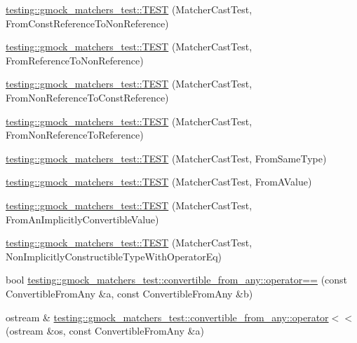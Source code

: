 \begin{DoxyCompactItemize}
\item 
\mbox{\hyperlink{namespacetesting_1_1gmock__matchers__test_a9d25aac0defd9296bf207cacd342aff0}{testing\+::gmock\+\_\+matchers\+\_\+test\+::\+T\+E\+ST}} (Matcher\+Cast\+Test, From\+Const\+Reference\+To\+Non\+Reference)
\item 
\mbox{\hyperlink{namespacetesting_1_1gmock__matchers__test_a4bb3955a1e0b603c0156c98a2dc49eea}{testing\+::gmock\+\_\+matchers\+\_\+test\+::\+T\+E\+ST}} (Matcher\+Cast\+Test, From\+Reference\+To\+Non\+Reference)
\item 
\mbox{\hyperlink{namespacetesting_1_1gmock__matchers__test_a6fd48b8275f96d9d4ee840f0ec590fb1}{testing\+::gmock\+\_\+matchers\+\_\+test\+::\+T\+E\+ST}} (Matcher\+Cast\+Test, From\+Non\+Reference\+To\+Const\+Reference)
\item 
\mbox{\hyperlink{namespacetesting_1_1gmock__matchers__test_ab8d3174b8f1ab799906938ed9984643b}{testing\+::gmock\+\_\+matchers\+\_\+test\+::\+T\+E\+ST}} (Matcher\+Cast\+Test, From\+Non\+Reference\+To\+Reference)
\item 
\mbox{\hyperlink{namespacetesting_1_1gmock__matchers__test_a8f845dd5b1bcdc660926d67dce32b5d2}{testing\+::gmock\+\_\+matchers\+\_\+test\+::\+T\+E\+ST}} (Matcher\+Cast\+Test, From\+Same\+Type)
\item 
\mbox{\hyperlink{namespacetesting_1_1gmock__matchers__test_a9dfc74e2f4c110e33bd7863c8bfd4532}{testing\+::gmock\+\_\+matchers\+\_\+test\+::\+T\+E\+ST}} (Matcher\+Cast\+Test, From\+A\+Value)
\item 
\mbox{\hyperlink{namespacetesting_1_1gmock__matchers__test_af7fee66e5f72e05ba28bcf122b127a95}{testing\+::gmock\+\_\+matchers\+\_\+test\+::\+T\+E\+ST}} (Matcher\+Cast\+Test, From\+An\+Implicitly\+Convertible\+Value)
\item 
\mbox{\hyperlink{namespacetesting_1_1gmock__matchers__test_a37953ae898b7426bce3104d95c098cba}{testing\+::gmock\+\_\+matchers\+\_\+test\+::\+T\+E\+ST}} (Matcher\+Cast\+Test, Non\+Implicitly\+Constructible\+Type\+With\+Operator\+Eq)
\item 
bool \mbox{\hyperlink{namespacetesting_1_1gmock__matchers__test_1_1convertible__from__any_a11d27383932d6907ea215955a8dacc3b}{testing\+::gmock\+\_\+matchers\+\_\+test\+::convertible\+\_\+from\+\_\+any\+::operator==}} (const Convertible\+From\+Any \&a, const Convertible\+From\+Any \&b)
\item 
ostream \& \mbox{\hyperlink{namespacetesting_1_1gmock__matchers__test_1_1convertible__from__any_a8bc42601c60dc9c5e42861c922d63e64}{testing\+::gmock\+\_\+matchers\+\_\+test\+::convertible\+\_\+from\+\_\+any\+::operator$<$$<$}} (ostream \&os, const Convertible\+From\+Any \&a)

\end{DoxyCompactItemize}
